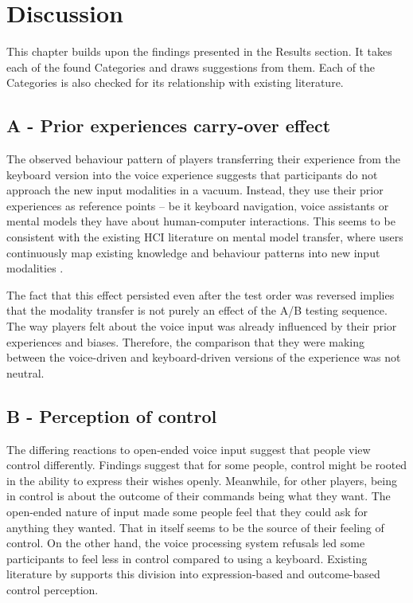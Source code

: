 \chapter{Discussion}

\label{ch:discussion}

This chapter builds upon the findings presented in the Results section. It takes each of the found Categories and draws suggestions from them. 
Each of the Categories is also checked for its relationship with existing literature.

\section{A - Prior experiences carry-over effect}

The observed behaviour pattern of players transferring their experience from the keyboard version into the voice experience suggests that participants do not approach the new input modalities in a vacuum. Instead, they use their prior experiences as reference points -- be it keyboard navigation, voice assistants or mental models they have about human-computer interactions. 
This seems to be consistent with the existing HCI literature on mental model transfer, where users continuously map existing knowledge and behaviour patterns into new input modalities \parencite{harneskExploringVoiceInteractions2019}.





The fact that this effect persisted even after the test order was reversed implies that the modality transfer is not purely an effect of the A/B testing sequence.
The way players felt about the voice input was already influenced by their prior experiences and biases. Therefore, the comparison that they were making between the voice-driven and keyboard-driven versions of the experience was not neutral. 


\section{B - Perception of control}

The differing reactions to open-ended voice input suggest that people view control differently. 
Findings suggest that for some people, control might be rooted in the ability to express their wishes openly. 
Meanwhile, for other players, being in control is about the outcome of their commands being what they want.
The open-ended nature of input made some people feel that they could ask for anything they wanted. That in itself seems to be the source of their feeling of control. 
On the other hand, the voice processing system refusals led some participants to feel less in control compared to using a keyboard.
Existing literature by \textcite{cornelioSenseAgencyEmerging2022} supports this division into expression-based and outcome-based control perception.


